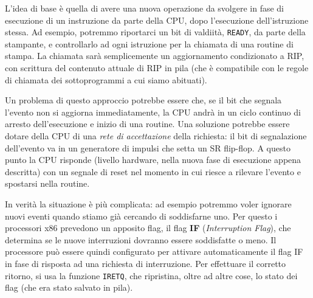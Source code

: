 \documentclass[a4paper,11pt]{article}
\begin{document}
L'idea di base è quella di avere una nuova operazione da svolgere in fase di esecuzione di un instruzione da parte della CPU, dopo l'esecuzione dell'istruzione stessa.
Ad esempio, potremmo riportarci un bit di valdiità, \lstinline|READY|, da parte della stampante, e controllarlo ad ogni istruzione per la chiamata di una routine di stampa.
La chiamata sarà semplicemente un aggiornamento condizionato a RIP, con scrittura del contenuto attuale di RIP in pila (che è compatibile con le regole di chiamata dei sottoprogrammi a cui siamo abituati).

Un problema di questo approccio potrebbe essere che, se il bit che segnala l'evento non si aggiorna immediatamente, la CPU andrà in un ciclo continuo di arresto dell'esecuzione e inizio di una routine.
Una soluzione potrebbe essere dotare della CPU di una \textit{rete di accettazione} della richiesta: il bit di segnalazione dell'evento va in un generatore di impulsi che setta un SR flip-flop. 
A questo punto la CPU risponde (livello hardware, nella nuova fase di esecuzione appena descritta) con un segnale di reset nel momento in cui riesce a rilevare l'evento e spostarsi nella routine. 

In verità la situazione è più complicata: ad esempio potremmo voler ignorare nuovi eventi quando stiamo già cercando di soddisfarne uno.
Per questo i processori x86 prevedono un apposito flag, il flag \textbf{IF} (\textit{Interruption Flag}), che determina se le nuove interruzioni dovranno essere soddisfatte o meno.
Il processore può essere quindi configurato per attivare automaticamente il flag IF in fase di risposta ad una richiesta di interruzione.
Per effettuare il corretto ritorno, si usa la funzione \lstinline|IRETQ|, che ripristina, oltre ad altre cose, lo stato dei flag (che era stato salvato in pila).
\end{document}
